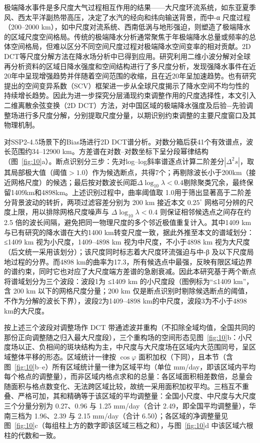 \documentclass[draft]{agujournal2019}
\begin{document}
极端降水事件是多尺度大气过程相互作用的结果------大尺度环流系统，如东亚夏季风、西太平洋副热带高压，决定了水汽的经向和纬向输送背景，而中-α 尺度过程（200--2000 km），如中尺度对流系统、西南低涡与地形强迫，则塑造了极端降水的区域尺度空间格局。传统的极端降水分析通常聚焦于年极端降水总量或频率的总体空间格局，但难以区分不同空间尺度过程对极端降水空间变率的相对贡献。2D DCT等尺度分解方法在降水场分析中已得到应用。研究利用二维小波分解对全球再分析资料的区域日降水强度和空间结构进行了多尺度分析，发现强降水事件在近20年中呈现增强趋势并伴随着空间范围的收缩，且在近20年呈加速趋势\cite{lussana_changes_2024}。也有研究提出的空间变异系数（SCV）框架进一步从全球尺度揭示了降水空间不均匀性的持续增长趋势\cite{liu_general_2025}。因此为进一步探究分层涌现约束调整作用的尺度选择性，本文引入二维离散余弦变换（2D DCT）方法，对中国区域的极端降水强度及后验\(-\)先验调整场进行多尺度分解，分别提取尺度分量，以期识别约束调整的主要尺度窗口及其物理机制。

对SSP2-4.5场景下的Bias场进行2D DCT谱分析。对数分箱后获41个有效谱点，波长范围约34--12900 km。方差谱在对数--对数坐标下呈分段幂律结构（图~\ref{fig:10}a）。断点识别分三步：先对log--log斜率谱逐点计算二阶差分\(|\Delta^2 s|\)，取其局部极大值（阈值\(>1.0\)）作为候选断点，共得7个；再剔除波长小于200km（接近网格尺度）的候选；最后按对数波长间距\(\Delta\log_{10}\lambda<0.4\)剔除聚类冗余，最终保留1409km和4898km。上述识别过程中，曲率阈值取 1.0用于筛出显著高于二阶差分背景波动的转折，两项过滤容差分别为 200 km 接近本文 \(0.25^\circ\) 网格可分辨的尺度上限，用以排除网格尺度噪声与 \(\Delta\log_{10}\lambda<0.4\) 则保证相邻候选点之间存在约 2.5 倍的波长间隔，避免把同一物理尺度的多个邻近极值重复计入。其中1409 km与已有研究的降水谱在大约1400 km转变尺度一致\cite{bielli_scale_2010}，据此外推至本文的谱域划分：≤1409 km 视为小尺度，1409--4898 km 视为中尺度，不小于4898 km 视为大尺度（后文统一采用该划分\cite{bielli_scale_2010}）；该尺度同时标志着大尺度环流强迫与中-β 及以下尺度局地过程的分界。而4898 km的曲率为17.3，所有候选点中最强，反映有限区域边界的谱约束，同时它也对应了大尺度端方差谱的急剧衰减。因此本研究基于两个断点将谱域划分为三个波段：波段1为 ≤1409 km 的小尺度段（图例标为``≤1409 km''，含 200 km 以下的网格尺度分量；200 km 仅是断点识别时剔除候选断点的阈值，不作为分解的波长下界），波段2为1409--4898 km的中尺度，波段3为不小于4898 km的大尺度。

按上述三个波段对调整场作 DCT 带通滤波并重构（不扣除全域均值，全国共同的那份正向调整随之归入最大尺度段），三个重构场的空间形态见图~\ref{fig:10}b：小尺度场以正、负相间的斑块结构为主，中尺度与大尺度场在区域内大范围同号，呈区域整体平移的形态。区域统计一律按 \(\cos\varphi\) 面积加权（下同），且本节（含图~\ref{fig:10}b--e）所有区域统计量一律为区域平均（单位 mm/day，即该区域内平均每个格点的调整量），而非区域内格点求和的总量：各区域面积相差数倍，总量会随面积与格点数变化、无法跨区域比较，故统一采用面积加权平均。三档互不重叠、严格可加，其和精确等于该区域的平均调整量：全国小尺度、中尺度与大尺度三个分量分别为 0.27、0.96 与 1.25 mm/day（合计 2.49，即全国平均调整量），华南三档为 1.96、2.39 与 2.15 mm/day（合计 6.50）；各区域的净调整量见图~\ref{fig:10}c（每组柱上方的数字即该区域三档之和），与图~\ref{fig:10}d 中该区域六根柱的代数和一致。
\end{document}

